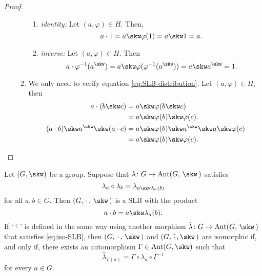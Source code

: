 \begin{proof}
\begin{enumerate}[\rm a)]
\begin{enumerate}[\rm i)]
\begin{enumerate}[-]
                \item \textit{identity:} Let $(a,\varphi)\in H$. Then,
                $$
                    a\cdot1=a\skw\varphi(1)=a\skw1=a.
                $$

                \item \textit{inverse:} Let $(a,\varphi)\in H$. Then
                $$
                    a\cdot\varphi^{-1}(a^\skw) = a\skw\varphi(\varphi^{-1}(a^\skw))=a\skw a^\skw=1.
                $$
            \end{enumerate}
            \item We only need to verify equation \eqref{eq:SLB-distribution}. Let $(a,\varphi)\in H$, then
            \begin{align*}
                a\cdot(b\skw c) &= a\skw\varphi(b\skw c)\\
                    &= a\skw\varphi(b)\skw\varphi(c).\\
                (a\cdot b)\skw a^\skw\skw (a\cdot c)
                    &= a\skw\varphi(b) \skw
                        a^\skw\skw a\skw\varphi(c)\\
                    &= a\skw\varphi(b)\skw\varphi(c).
            \end{align*}
        \end{enumerate}
    \end{enumerate}
\end{proof}

\begin{prop}\label{lem:iso-SLB}
    Let\/ $(G,\skw)$ be a group. Suppose that\/ $\lambda\colon G\to\Aut(G,\,\skw\,)$ satisfies
    \begin{equation}\label{eq:iso-SLB}
        \lambda_a\circ\lambda_b = \lambda_{a\skw\lambda_a(b)}
    \end{equation}
    for all\/ $a,b\in G$. Then\/ $(G,\,\cdot\,,\,\skw\,)$ is a SLB with the product
    \begin{equation}\label{eq:cdot-from-lambda}
        a\cdot b = a\skw\lambda_a(b).
    \end{equation}
    If\/ {\rm`$\hat{\,\cdot\,}$'} is defined in the same way using another morphism\/ $\hat\lambda\colon G\to\Aut(G,\,\skw\,)$ that satisfies \eqref{eq:iso-SLB}, then\/ $(G,\,\cdot\,,\,\skw\,)$ and\/ $(G,\,\hat\cdot\,,\skw\,)$ are isomorphic if, and only if, there exists an automorphism\/ $\Gamma\in\Aut(G,\skw)$ such that 
    \begin{equation}\label{eq:isO-SLB-lambda}
        \hat\lambda_{\Gamma(a)}=\Gamma\circ\lambda_a\circ\Gamma^{-1}
    \end{equation}
    for every\/ $a\in G$.
\end{prop}

